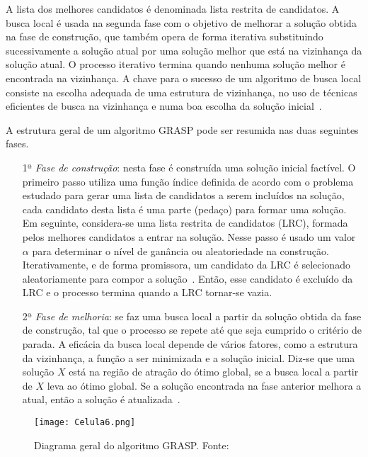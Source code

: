 A lista dos melhores candidatos é denominada lista restrita de candidatos. A busca local é usada na segunda fase com o objetivo de melhorar a solução obtida na fase de construção, que também opera de forma iterativa substituindo sucessivamente a solução atual por uma solução melhor que está na vizinhança da solução atual. O processo iterativo termina quando nenhuma solução melhor é encontrada na vizinhança. A chave para o sucesso de um algoritmo de busca local consiste na escolha adequada de uma estrutura de vizinhança, no uso de técnicas eficientes de busca na vizinhança e numa boa escolha da solução inicial~\citep{feo1995greedy}.

A estrutura geral de um algoritmo GRASP pode ser resumida nas duas seguintes fases. 
\begin{enumerate}
\item[1ª] \textit{Fase de construção}: nesta fase é construída uma solução inicial factível. O primeiro passo utiliza uma função índice definida de acordo com o problema estudado para gerar uma lista de candidatos a serem incluídos na solução, cada candidato desta lista é uma parte (pedaço) para formar uma solução. Em seguinte, considera-se uma lista restrita de candidatos (LRC), formada pelos melhores candidatos a entrar na solução. Nesse passo é usado um valor $\alpha$ para determinar o nível de ganância ou aleatoriedade na construção. Iterativamente, e de forma promissora, um candidato da LRC é selecionado aleatoriamente para compor a solução~\citep{pitsoulis2002greedy}. Então, esse candidato é excluído da LRC e o processo termina quando a LRC tornar-se vazia.  
    
\item[2ª] \textit{Fase de melhoria}: se faz uma busca local a partir da solução obtida da fase de construção, tal que o processo se repete até que seja cumprido o critério de parada. A eficácia da busca local depende de vários fatores, como a estrutura da vizinhança, a função a ser minimizada e a solução inicial. Diz-se que uma solução $X$ está na região de atração do ótimo global, se a busca local a partir de $X$ leva ao ótimo global. Se a solução encontrada na fase anterior melhora a atual, então a solução é atualizada~\citep{pitsoulis2002greedy}.
\end{enumerate}

\begin{figure}[t]
\begin{center}
\texttt{[image: Celula6.png]}
\caption{Diagrama geral do algoritmo GRASP. Fonte:~\cite{nagyoff}}\label{fig:06}
\end{center}
\end{figure}


